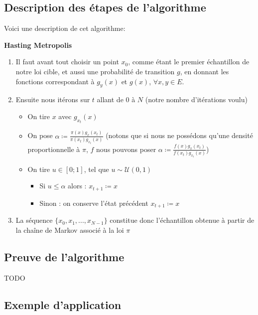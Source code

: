 \documentclass{article}
\begin{document}
\label{description-algo-hast-met}
\subsection{Description des étapes de l'algorithme}

Voici une description de cet algorithme:

{\bf Hasting Metropolis} \begin{enumerate}
    \item Il faut avant tout choisir un point $x_0$, comme étant le premier échantillon de notre loi cible, et aussi une probabilité de transition $g$, en donnant les fonctions correspondant à $g_y(x)$ et $g(x)$, $\forall x,y \in E$.
    \item Ensuite nous itérons sur $t$ allant de 0 à $N$ (notre nombre d'itérations voulu)
    \begin{itemize}
        \item On tire $x$ avec $g_{x_t}(x)$  
        \item On pose $\alpha \coloneqq \frac{ \pi(x) g_x(x_t)}{\pi(x_t) g_{x_t}(x)}$ (notons que si nous ne possédons qu'une densité proportionnelle à $\pi$, $f$ nous pouvons poser $\alpha \coloneqq \frac{ f(x) g_x(x_t)}{f(x_t) g_{x_t}(x)}$)  
        \item On tire $u \in [0;1]$, tel que $u  \sim \mathcal{U}(0,1)$ 
        \begin{itemize}
            \item Si $u \leqslant \alpha$ alors : $x_{t+1} \coloneqq x$  
            \item Sinon : on conserve l'état précédent $x_{t+1} \coloneqq x$  
        \end{itemize}
    \end{itemize}
    \item La séquence $\{x_0,x_1, ... ,x_{N-1}\}$ constitue donc l'échantillon obtenue à partir de la chaîne de Markov associé à la loi $\pi$
\end{enumerate}

\subsection{Preuve de l'algorithme}

TODO \\

\subsection{Exemple d'application}
\end{document}
